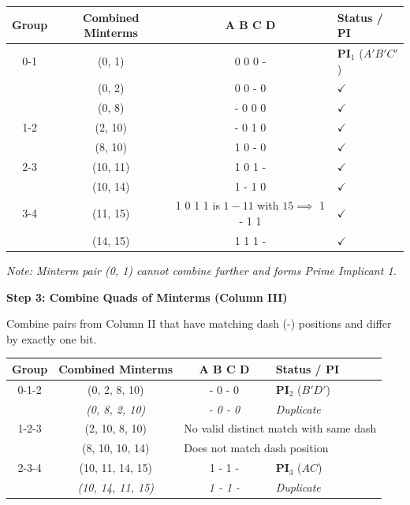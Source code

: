 \documentclass[12pt,a3paper]{article}
\begin{document}
\begin{enumerate}
\begin{tcolorbox}[enhanced,breakable,ansbox,colback=cC!4,colframe=cC,boxrule=0.8pt,arc=5pt,title={\textbf{Answer}},fonttitle=\bfseries\color{white},colbacktitle=cC]
\begin{center}
\begin{tabular}{cccl}
\toprule
\textbf{Group} & \textbf{Combined Minterms} & \textbf{A B C D} & \textbf{Status / PI} \\
\midrule
0-1 & (0, 1)  & 0 0 0 - & \textbf{PI$_1$} ($A'B'C'$) \\
    & (0, 2)  & 0 0 - 0 & $\checkmark$ \\
    & (0, 8)  & - 0 0 0 & $\checkmark$ \\
\midrule
1-2 & (2, 10) & - 0 1 0 & $\checkmark$ \\
    & (8, 10) & 1 0 - 0 & $\checkmark$ \\
\midrule
2-3 & (10, 11)& 1 0 1 - & $\checkmark$ \\
    & (10, 14)& 1 - 1 0 & $\checkmark$ \\
\midrule
3-4 & (11, 15)& 1 0 1 1 is $1 - 1 1$ with $15 \implies$ 1 - 1 1 & $\checkmark$ \\
    & (14, 15)& 1 1 1 - & $\checkmark$ \\
\bottomrule
\end{tabular}
\end{center}
\textit{Note: Minterm pair (0, 1) cannot combine further and forms Prime Implicant 1.}

\vspace{1em}
\textbf{Step 3: Combine Quads of Minterms (Column III)}

Combine pairs from Column II that have matching dash (-) positions and differ by exactly one bit.

\begin{center}
\begin{tabular}{cccl}
\toprule
\textbf{Group} & \textbf{Combined Minterms} & \textbf{A B C D} & \textbf{Status / PI} \\
\midrule
0-1-2 & (0, 2, 8, 10)   & - 0 - 0 & \textbf{PI$_2$} ($B'D'$) \\
      & \textit{(0, 8, 2, 10)}   & \textit{- 0 - 0} & \textit{Duplicate} \\
\midrule
1-2-3 & (2, 10, 8, 10)  & \multicolumn{2}{l}{No valid distinct match with same dash} \\
      & (8, 10, 10, 14) & \multicolumn{2}{l}{Does not match dash position} \\
\midrule
2-3-4 & (10, 11, 14, 15) & 1 - 1 - & \textbf{PI$_3$} ($AC$) \\
      & \textit{(10, 14, 11, 15)} & \textit{1 - 1 -} & \textit{Duplicate} \\
\bottomrule
\end{tabular}
\end{center}


\end{tcolorbox}
\end{enumerate}
\end{document}
